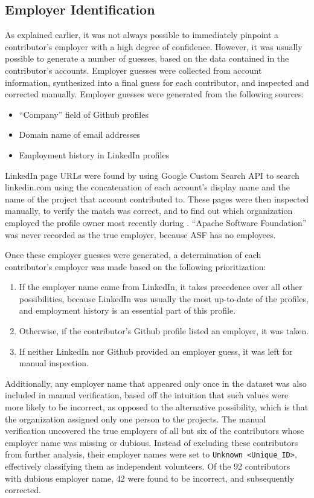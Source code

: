 \subsection{Employer Identification}\label{employersec}
As explained earlier, it was not always possible to immediately pinpoint a contributor's employer with a high degree of confidence. However, it was usually possible to generate a number of guesses, 
based on the data contained in the contributor's accounts. Employer guesses were collected from account information, synthesized into a final guess for each contributor, and inspected and corrected manually.
Employer guesses were generated from the following sources:
\begin{itemize}
	\item ``Company'' field of Github profiles
	\item Domain name of email addresses
	\item Employment history in LinkedIn profiles
\end{itemize}
LinkedIn page URLs were found by using Google Custom Search API to search linkedin.com using the concatenation of each account's display name and the name of the project that account contributed to. These pages were then inspected manually, to verify the match was correct, and to find out which organization employed the profile owner most recently during \timeperiod{}. ``Apache Software Foundation'' was never recorded as the true employer, because ASF has no employees\cite{asf}.

Once these employer guesses were generated, a determination of each contributor's employer was made based on the following prioritization:
\begin{enumerate}
	\item If the employer name came from LinkedIn, it takes precedence over all other possibilities, because LinkedIn was usually the most up-to-date of the profiles, and employment history is an essential part of this profile.
	\item Otherwise, if the contributor's Github profile listed an employer, it was taken.
	\item If neither LinkedIn nor Github provided an employer guess, it was left for manual inspection.
\end{enumerate}
Additionally, any employer name that appeared only once in the dataset was also included in manual verification, based off the intuition that such values were more likely to be incorrect, as opposed to the alternative possibility, which is that the organization assigned only one person to the projects.
The manual verification uncovered the true employers of all but six of the contributors whose employer name was missing or dubious. Instead of excluding these contributors from further analysis, their employer names were set to \verb|Unknown <Unique_ID>|, effectively classifying them as independent volunteers. Of the 92 contributors with dubious employer name, 42 were found to be incorrect, and subsequently corrected.

